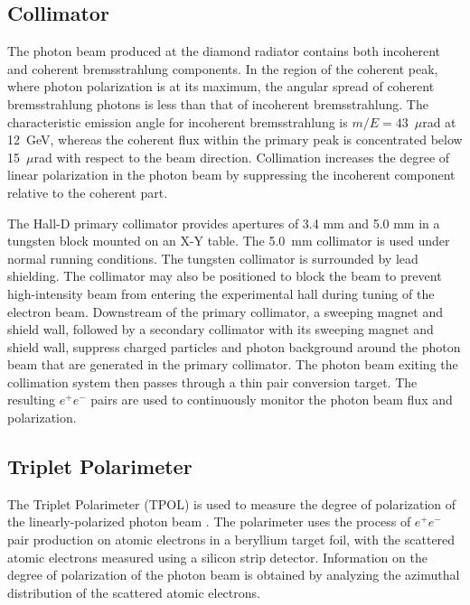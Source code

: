 \subsection{Collimator}
The photon beam produced at the diamond radiator contains both incoherent
and coherent bremsstrahlung components. In the region of the coherent peak,
where photon polarization is at its maximum, the angular spread of coherent
bremsstrahlung photons is less than that of incoherent bremsstrahlung.
The characteristic emission angle for incoherent bremsstrahlung is
$m/E = 43$~$\mu$rad at 12~GeV, whereas the coherent flux within the
primary peak is concentrated below 15~$\mu$rad with respect to the beam
direction. Collimation increases the degree of linear polarization in
the photon beam by suppressing the incoherent component relative to the
coherent part.

The Hall-D primary collimator provides apertures of 3.4 mm and 5.0 mm in a
tungsten block mounted on an X-Y table. The 5.0~mm collimator is used
under normal \GX{} running conditions.
The tungsten collimator is surrounded by lead shielding.
The collimator may also be positioned to block the beam to prevent
high-intensity beam from entering the experimental hall during tuning
of the electron beam. Downstream of the primary collimator, a
sweeping magnet and shield wall, followed by a secondary collimator
with its sweeping magnet and shield wall, suppress charged
particles and photon background around the photon beam that are
generated in the primary collimator. The photon beam exiting the
collimation system then passes through a thin pair conversion target. The resulting $e^+e^-$ pairs are used to continuously monitor the photon beam flux and polarization.

\subsection{Triplet Polarimeter \label{sec:tpol}}
The Triplet Polarimeter (TPOL) is used to measure the degree of polarization
of the linearly-polarized photon beam \cite{DUGGER2017115}.
The polarimeter uses the process of $e^+e^-$ pair production on atomic electrons 
in a beryllium target foil, with the scattered atomic electrons
measured using a silicon strip detector.
Information on the degree of polarization of the photon beam is
obtained by analyzing the azimuthal distribution of the scattered
atomic electrons.

